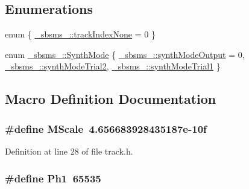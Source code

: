 \subsection*{Enumerations}
\begin{DoxyCompactItemize}
\item 
enum \{ \hyperlink{namespace__sbsms___aebffbcbc2857b24d969485e5446a6b42af925ccbf461ff83358bde6804b239055}{\+\_\+sbsms\+\_\+\+::track\+Index\+None} = 0
 \}
\item 
enum \hyperlink{namespace__sbsms___aea7c2cadef128d5fe8bb8fae87c5b7b2}{\+\_\+sbsms\+\_\+\+::\+Synth\+Mode} \{ \hyperlink{namespace__sbsms___aea7c2cadef128d5fe8bb8fae87c5b7b2ab64683b26bf56d98d414854c6b0ad4f8}{\+\_\+sbsms\+\_\+\+::synth\+Mode\+Output} = 0, 
\hyperlink{namespace__sbsms___aea7c2cadef128d5fe8bb8fae87c5b7b2a1e1a04941af58dae56623c1e7238de3c}{\+\_\+sbsms\+\_\+\+::synth\+Mode\+Trial2}, 
\hyperlink{namespace__sbsms___aea7c2cadef128d5fe8bb8fae87c5b7b2a9e16f3f415a08ff0e0c809d9e41869dd}{\+\_\+sbsms\+\_\+\+::synth\+Mode\+Trial1}
 \}
\end{DoxyCompactItemize}


\subsection{Macro Definition Documentation}
\subsubsection[{\texorpdfstring{M\+Scale}{MScale}}]{\setlength{\rightskip}{0pt plus 5cm}\#define M\+Scale~4.\+656683928435187e-\/10f}\hypertarget{lib-src_2sbsms_2src_2track_8h_af834a1d6a5d0769ee6a01d675b3201d5}{}\label{lib-src_2sbsms_2src_2track_8h_af834a1d6a5d0769ee6a01d675b3201d5}


Definition at line 28 of file track.\+h.

\subsubsection[{\texorpdfstring{Ph1}{Ph1}}]{\setlength{\rightskip}{0pt plus 5cm}\#define Ph1~65535}\hypertarget{lib-src_2sbsms_2src_2track_8h_ad657dc616a13678a5c3c964a796a393f}{}\label{lib-src_2sbsms_2src_2track_8h_ad657dc616a13678a5c3c964a796a393f}


